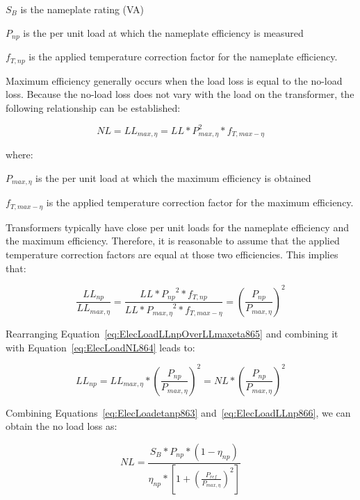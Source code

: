 \({S_B}\) is the nameplate rating (VA)

\({P_{np}}\) is the per unit load at which the nameplate efficiency is measured

\({f_{T,np}}\) is the applied temperature correction factor for the nameplate efficiency.

Maximum efficiency generally occurs when the load loss is equal to the no-load loss. Because the no-load loss does not vary with the load on the transformer, the following relationship can be established:

\begin{equation}
NL = L{L_{max,\eta}} = LL*P_{max,\eta }^2*{f_{T,max-\eta}}
\label{eq:ElecLoadNL864}
\end{equation}

where:

\({P_{max,\eta}}\) is the per unit load at which the maximum efficiency is obtained

\({f_{T,max-\eta}}\) is the applied temperature correction factor for the maximum efficiency.

Transformers typically have close per unit loads for the nameplate efficiency and the maximum efficiency. Therefore, it is reasonable to assume that the applied temperature correction factors are equal at those two efficiencies. This implies that:

\begin{equation}
\frac{{L{L_{np}}}}{{L{L_{max,\eta}}}} = \frac{{LL*{P_{np}}^2*{f_{T,np}}}}{{LL*{P_{max,\eta}}^2*{f_{T,max-\eta}}}} = {\left( {\frac{{{P_{np}}}}{{{P_{max,\eta}}}}} \right)^2}
\label{eq:ElecLoadLLnpOverLLmaxeta865}
\end{equation}

Rearranging Equation~\ref{eq:ElecLoadLLnpOverLLmaxeta865} and combining it with Equation~\ref{eq:ElecLoadNL864} leads to:

\begin{equation}
L{L_{np}} = L{L_{max,\eta}}*{\left( {\frac{{{P_{np}}}}{{{P_{max,\eta}}}}} \right)^2} = NL*{\left( {\frac{{{P_{np}}}}{{{P_{max,\eta}}}}} \right)^2}
\label{eq:ElecLoadLLnp866}
\end{equation}

Combining Equations~\ref{eq:ElecLoadetanp863} and~\ref{eq:ElecLoadLLnp866}, we can obtain the no load loss as:

\begin{equation}
NL = \frac{{{S_B}*{P_{np}}*(1 - {\eta_{np}})}}{{{\eta_{np}}*\left[ {1 + {{\left( {\frac{{{P_{ref}}}}{{P{}_{max,\eta}}}} \right)}^2}} \right]}}
\label{eq:NoLoadLossAtRatedCondition}
\end{equation}

